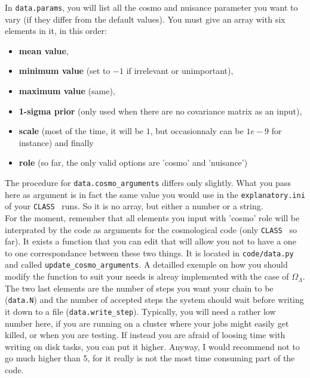 \documentclass[10pt]{article}
\newcommand{\CLASS}{\texttt{CLASS}}
\begin{document}
  In \verb?data.params?, you will list all the cosmo and nuisance parameter you
  want to vary (if they differ from the default values). You must give an array
  with six elements in it, in this order: 
  \begin{itemize}
    \item {\bf mean value}, 
    \item {\bf minimum value} (set to $-1$ if irrelevant or unimportant), 
    \item {\bf maximum value} (same), 
    \item {\bf 1-sigma prior} (only used when there are no covariance matrix as
      an input),
    \item {\bf scale} (most of the time, it will be $1$, but occasionnaly can
      be $1e-9$ for instance) and finally 
    \item {\bf role} (so far, the only valid options are 'cosmo' and
      'nuisance')
  \end{itemize}
  
  The procedure for \verb?data.cosmo_arguments? differs only slightly. What you
  pass here as argument is in fact the same value you would use in the
  \verb?explanatory.ini? of your \CLASS~ runs. So it is no array, but either a
  number or a string.\\

  For the moment, remember that all elements you input with 'cosmo' role will
  be interprated by the code as arguments for the cosmological code (only
  \CLASS~ so far). It exists a function that you can edit that will allow you
  not to have a one to one correspondance between these two things. It is
  located in \verb?code/data.py? and called \verb?update_cosmo_arguments?. A
  detailled exemple on how you should modify the function to suit your needs is
  alreay implemented with the case of $\Omega_{\Lambda}$.\\

  The two last elements are the number of steps you want your chain to be
  (\verb?data.N?) and the number of accepted steps the system should wait
  before writing it down to a file (\verb?data.write_step?). Typically, you
  will need a rather low number here, if you are running on a cluster where
  your jobs might easily get killed, or when you are testing. If instead you
  are afraid of loosing time with writing on disk tasks, you can put it higher.
  Anyway, I would recommend not to go much higher than 5, for it really is not
  the most time consuming part of the code.\\
\end{document}
